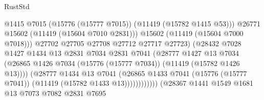 \begin{lexlean}{RustStd}
\begin{coremodule}
                                                @1415
                                                @7015
                                                (@15776 (@15777 @7015))
                                                (@11419 (@15782 @1415 @53)))
                                              @26771
                                              @15602
                                              (@11419 (@15604 @7010 @2831)))
                                            @15602
                                            (@11419 (@15604 @7000 @7018)))
                                          @27702
                                          @27705
                                          @27708
                                          @27712
                                          @27717
                                          @27723)
                                        (@28432
                                          @7028
                                          @1427
                                          @1434
                                          @13
                                          @2831
                                          @7034
                                          @2831
                                          @7041
                                          (@28777
                                            @1427
                                            @13
                                            @7034
                                            (@26865
                                              @1426
                                              @7034
                                              (@15776 (@15777 @7034))
                                              (@11419 (@15782 @1426 @13))))
                                          (@28777
                                            @1434
                                            @13
                                            @7041
                                            (@26865
                                              @1433
                                              @7041
                                              (@15776 (@15777 @7041))
                                              (@11419 (@15782 @1433 @13))))))))))))
                          (@28367
                            @1441
                            @1549
                            @1681
                            @13
                            @7073
                            @7082
                            @2831
                            @7695

\end{coremodule}
\end{lexlean}
